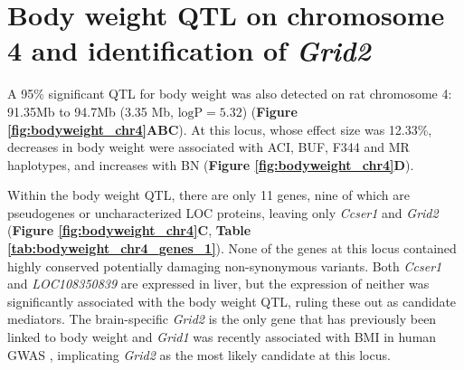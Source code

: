 \section{Body weight QTL on chromosome 4 and identification of \textit{Grid2}}

A 95\% significant QTL for body weight was also detected on rat chromosome 4: 91.35Mb to 94.7Mb (3.35 Mb, $\text{logP} = 5.32$) (\textbf{Figure \ref{fig:bodyweight_chr4}ABC}). At this locus, whose effect size was 12.33\%, decreases in body weight were associated with ACI, BUF, F344 and MR haplotypes, and increases with BN (\textbf{Figure \ref{fig:bodyweight_chr4}D}). 

Within the body weight QTL, there are only 11 genes, nine of which are pseudogenes or uncharacterized LOC proteins, leaving only \textit{Ccser1} and \textit{Grid2} (\textbf{Figure \ref{fig:bodyweight_chr4}C}, \textbf{Table \ref{tab:bodyweight_chr4_genes_1}}). None of the genes at this locus contained highly conserved potentially damaging non-synonymous variants. Both \textit{Ccser1} and \textit{LOC108350839} are expressed in liver, but the expression of neither was significantly associated with the body weight QTL, ruling these out as candidate mediators. The brain-specific \textit{Grid2} is the only gene that has previously been linked to body weight \citep{Nikpay2012} and \textit{Grid1} was recently associated with BMI in human GWAS \citep{Locke2015}, implicating \textit{Grid2} as the most likely candidate at this locus. 

